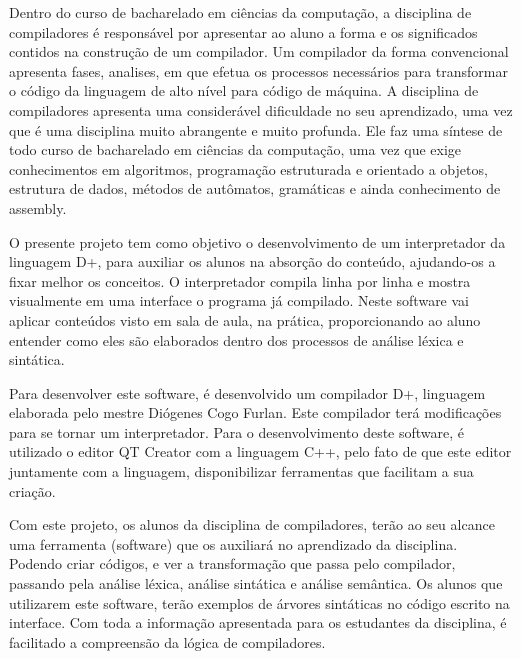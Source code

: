 \documentclass[12pt,oneside,a4paper,chapter=TITLE,section=TITLE,sumario=tradicional]{abntex2}
\begin{document}
Dentro do curso de bacharelado em ciências da computação, a disciplina de compiladores é responsável por apresentar ao aluno a forma e os significados contidos na construção de um compilador. Um compilador da forma convencional apresenta fases, analises, em que efetua os processos necessários para transformar o código da linguagem de alto nível para código de máquina. A disciplina de compiladores apresenta uma considerável dificuldade no seu aprendizado, uma vez que é uma disciplina muito abrangente e muito profunda. Ele faz uma síntese de todo curso de bacharelado em ciências da computação, uma vez que exige conhecimentos em algoritmos, programação estruturada e orientado a objetos, estrutura de dados, métodos de autômatos, gramáticas e ainda conhecimento de assembly. 

O presente projeto tem como objetivo o desenvolvimento de um interpretador da linguagem D+, para auxiliar os alunos na absorção do conteúdo, ajudando-os a fixar melhor os conceitos. O interpretador compila linha por linha e mostra visualmente em uma interface o programa já compilado. Neste software vai aplicar conteúdos visto em sala de aula, na prática, proporcionando ao aluno entender como eles são elaborados dentro dos processos de análise léxica e sintática.

Para desenvolver este software, é desenvolvido um compilador D+, linguagem elaborada pelo mestre Diógenes Cogo Furlan. Este compilador terá modificações para se tornar um interpretador. Para o desenvolvimento deste software, é utilizado o editor QT Creator com a linguagem C++, pelo fato de que este editor juntamente com a linguagem, disponibilizar ferramentas que facilitam a sua criação.

Com este projeto, os alunos da disciplina de compiladores, terão ao seu alcance uma ferramenta (software) que os auxiliará no aprendizado da disciplina. Podendo criar códigos, e ver a transformação que passa pelo compilador, passando pela análise léxica, análise sintática e análise semântica. Os alunos que utilizarem este software, terão exemplos de árvores sintáticas no código escrito na interface. Com toda a informação apresentada para os estudantes da disciplina, é facilitado a compreensão da lógica de compiladores.

\end{document}
